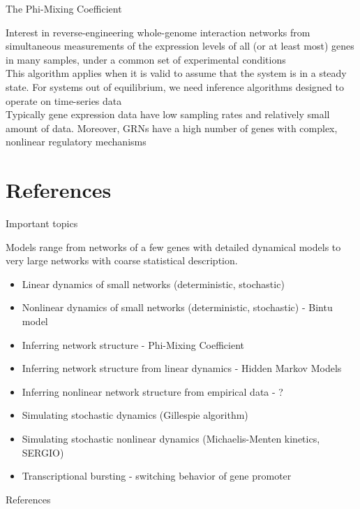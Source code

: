 \documentclass[aspectratio=1610]{beamer}					%
\begin{document}
\begin{frame}{The Phi-Mixing Coefficient}

Interest in reverse-engineering whole-genome interaction networks from simultaneous measurements of the
expression levels of all (or at least most) genes in many
samples, under a common set of experimental conditions\\
\vspace{0.2in}
This algorithm applies when it is valid to assume that the system is in a steady state. For systems out of equilibrium, we need inference algorithms designed to operate on time-series data\\
\vspace{0.2in}
Typically gene expression data have low sampling rates and relatively small
amount of data. Moreover, GRNs have a high number of genes
with complex, nonlinear regulatory mechanisms

\end{frame}

\section{References}

\begin{frame}{Important topics}

Models range from networks of a few genes with detailed dynamical models to very large networks with coarse statistical description.
\vspace{0.2in}

\begin{itemize}
\item Linear dynamics of small networks (deterministic, stochastic)
\item Nonlinear dynamics of small networks (deterministic, stochastic) - Bintu model
\item Inferring network structure - Phi-Mixing Coefficient
\item Inferring network structure from linear dynamics - Hidden Markov Models
\item Inferring nonlinear network structure from empirical data - ?
\item Simulating stochastic dynamics (Gillespie algorithm)
\item Simulating stochastic nonlinear dynamics (Michaelis-Menten kinetics, SERGIO)
\item Transcriptional bursting - switching behavior of gene promoter
\end{itemize}


\end{frame}

\begin{frame}[allowframebreaks]{References}
	\tiny
	
\end{frame}
\end{document}
